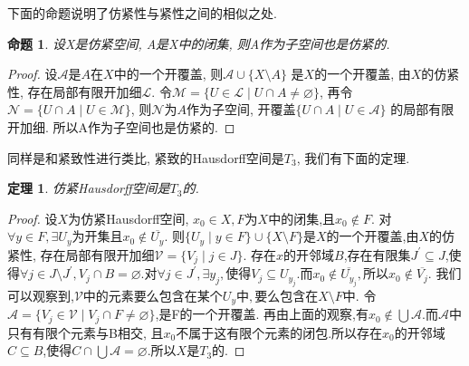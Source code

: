 \documentclass[a4paper,UTF8]{ctexart}
\newtheorem{thm}[theorem]{定理} %
\newtheorem{proposition}[theorem]{命题}
\begin{document}
下面的命题说明了仿紧性与紧性之间的相似之处.

\begin{proposition}
  设X是仿紧空间, A是X中的闭集, 则A作为子空间也是仿紧的.
\end{proposition}
\begin{proof}
  设$\mathscr{A}$是$A$在$X$中的一个开覆盖, 则$\mathscr{A} \cup \{ X \setminus A \}$
  是$X$的一个开覆盖, 由$X$的仿紧性, 存在局部有限开加细$\mathscr{L}$.
  令$\mathscr{M} = \{ U \in \mathscr{L} \mid U \cap A \neq \varnothing \}$,
  再令$\mathscr{N} = \{ U \cap A \mid U \in \mathscr{M} \}$,
  则$\mathscr{N}$为$A$作为子空间, 开覆盖$\{ U \cap A \mid U \in \mathscr{A} \}$
  的局部有限开加细. 所以A作为子空间也是仿紧的.
\end{proof}

同样是和紧致性进行类比, 紧致的Hausdorff空间是$T_3$, 我们有下面的定理.

\begin{thm} \label{thm:paracompact T2}
  仿紧Hausdorff空间是$T_3$的.
\end{thm}
\begin{proof}
  设$X$为仿紧Hausdorff空间, $x_0 \in X, F$为$X$中的闭集,且$x_0 \notin F$.
  对$\forall y \in F, \exists U_y \text{为开集且} x_0 \notin \overline{U_y}.$
  则$\{ U_y \mid y \in F\} \cup \{ X \setminus F \}$是$X$的一个开覆盖,由$X$的仿紧性,
  存在局部有限开加细$\mathscr{V} = \{ V_j \mid j \in J \}$.
  存在$x$的开邻域$B$,存在有限集$J^{'} \subseteq J$,使得$\forall j \in J \setminus J^{'},
  V_j \cap B = \varnothing$.对$\forall j \in J^{'}, \exists y_j, \text{使得}
  V_j \subseteq U_{y_j}$.而$x_0 \notin \overline{U_{y_j}}, \text{所以} x_0 \notin \overline{V_j}$.
  我们可以观察到,$\mathscr{V}\text{中的元素要么包含在某个}U_y\text{中},\text{要么包含在} X \setminus F$中.
  令$\mathscr{A} = \{ V_j \in \mathscr{V} \mid V_j \cap F \neq \varnothing \}$,是F的一个开覆盖.
  再由上面的观察,有$x_0 \notin \bigcup \mathscr{A}$.而$\mathscr{A}$中只有有限个元素与B相交,
  且$x_0$不属于这有限个元素的闭包.所以存在$x_0$的开邻域$C \subseteq B$,使得$C \cap \bigcup \mathscr{A}
  = \varnothing$.所以$X$是$T_3$的.
\end{proof}
\end{document}
